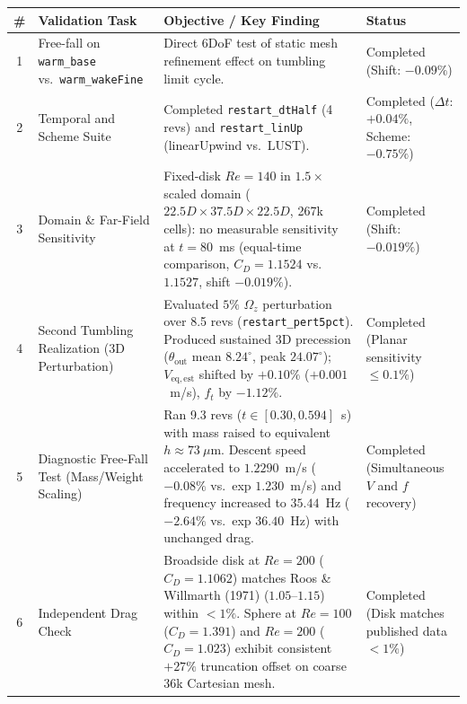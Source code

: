 \documentclass[11pt,a4paper]{article}
\begin{document}
\begin{table}[H]
\centering
\small
\begin{tabularx}{\textwidth}{c >{\raggedright\arraybackslash}p{42mm} >{\raggedright\arraybackslash}X >{\centering\arraybackslash}p{32mm}}
\toprule
\textbf{\#} & \textbf{Validation Task} & \textbf{Objective / Key Finding} & \textbf{Status} \\
\midrule
1 & Free-fall on \texttt{warm\_base} vs.\ \texttt{warm\_wakeFine} & Direct 6DoF test of static mesh refinement effect on tumbling limit cycle. & Completed \newline (Shift: $-0.09\%$) \\
2 & Temporal and Scheme Suite & Completed \texttt{restart\_dtHalf} (4 revs) and \texttt{restart\_linUp} (linearUpwind vs.\ LUST). & Completed \newline ($\Delta t$: $+0.04\%$, Scheme: $-0.75\%$) \\
3 & Domain \& Far-Field Sensitivity & Fixed-disk $Re = 140$ in $1.5\times$ scaled domain ($22.5D \times 37.5D \times 22.5D$, 267k cells): no measurable sensitivity at $t = 80$~ms (equal-time comparison, $C_D = 1.1524$ vs.\ $1.1527$, shift $-0.019\%$). & Completed \newline (Shift: $-0.019\%$) \\
4 & Second Tumbling Realization (3D Perturbation) & Evaluated $5\%$ $\Omega_z$ perturbation over 8.5 revs (\texttt{restart\_pert5pct}). Produced sustained 3D precession ($\theta_{\mathrm{out}}$ mean $8.24^\circ$, peak $24.07^\circ$); $V_{\mathrm{eq,est}}$ shifted by $+0.10\%$ ($+0.001$~m/s), $f_t$ by $-1.12\%$. & Completed \newline (Planar sensitivity $\le 0.1\%$) \\
5 & Diagnostic Free-Fall Test (Mass/Weight Scaling) & Ran 9.3 revs ($t \in [0.30, 0.594]$~s) with mass raised to equivalent $h \approx 73\ \mu$m. Descent speed accelerated to $1.2290$~m/s ($-0.08\%$ vs.\ exp $1.230$~m/s) and frequency increased to $35.44$~Hz ($-2.64\%$ vs.\ exp $36.40$~Hz) with unchanged drag. & Completed \newline (Simultaneous $V$ and $f$ recovery) \\
6 & Independent Drag Check & Broadside disk at $Re = 200$ ($C_D = 1.1062$) matches Roos \& Willmarth (1971) ($1.05\text{--}1.15$) within $< 1\%$. Sphere at $Re = 100$ ($C_D = 1.391$) and $Re = 200$ ($C_D = 1.023$) exhibit consistent $+27\%$ truncation offset on coarse 36k Cartesian mesh. & Completed \newline (Disk matches published data $< 1\%$) \\

\end{tabularx}
\end{table}
\end{document}
